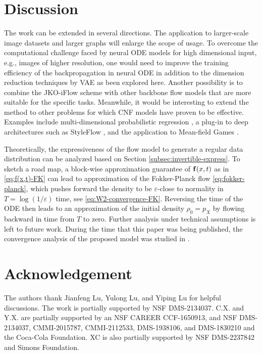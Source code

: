 \documentclass{article}
\theoremstyle{remark}
\theoremstyle{plain}
\newcommand{\JKO}{JKO-iFlow}
\newcommand{\revold}[1]{{\color{black}#1}}
\begin{document}
{\section{Discussion}\label{sec:conclude}


The work can be extended in several directions.
%
The application to larger-scale image datasets
and larger graphs will enlarge the scope of usage.
To overcome the computational challenge faced by neural ODE models for high dimensional input, e.g., images of higher resolution, one would need to improve the training efficiency of the backpropagation in neural ODE in addition to the dimension reduction techniques by VAE as been explored here. 
Another possibility is to combine the \JKO{} scheme with other backbone flow models that are more suitable for the specific tasks. 
% 
Meanwhile, it would be interesting to extend the method to other problems for which CNF models have proven to be effective. 
Examples include 
multi-dimensional probabilistic regression \citep{chen2018neural}, 
a plug-in to deep architectures such as StyleFlow \citep{abdal2021styleflow},
and the application to Mean-field Games \citep{huang2023bridging}. 


Theoretically, the expressiveness of the flow model to generate a regular data distribution can be analyzed based on Section \ref{subsec:invertible-express}.
To sketch a road map,
a block-wise approximation guarantee of ${\bf f}(x,t)$ as in \eqref{eq:f(x,t)-FK} can lead to approximation of the Fokker-Planck flow \eqref{eq:fokker-planck}, which pushes forward the density to be $\varepsilon$-close to normality in $T= \log (1/\varepsilon )$ time, see \eqref{eq:W2-convergence-FK}. 
Reversing the time of the ODE then leads to an approximation of the initial density $\rho_0 = p_X$ by flowing backward in time from $T$ to zero. Further analysis under technical assumptions is left to future work. \revold{During the time that this paper was being published, the convergence analysis of the proposed model was studied in \cite{cheng2023convergence}.}



\section*{Acknowledgement}

The authors thank Jianfeng Lu, Yulong Lu, and  Yiping Lu for helpful discussions.
The work is partially supported by NSF DMS-2134037.
C.X. and Y.X. are partially supported by an NSF CAREER CCF-1650913, and NSF DMS-2134037, CMMI-2015787, CMMI-2112533, DMS-1938106, and DMS-1830210 and the Coca-Cola Foundation.
XC is also partially supported by 
NSF DMS-2237842 and Simons Foundation. 


}
\end{document}
